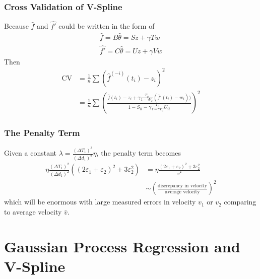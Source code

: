 \documentclass{beamer}
\begin{document}
\begin{frame}
\frametitle{Cross Validation of V-Spline}

Because $\hat{f}$ and $\hat{f'}$ could be written in the form of
\begin{align*}
\hat{f}=B\hat{\theta}=Sz+\gamma Tw\\
\hat{f'}=C\hat{\theta}=Uz+\gamma Vw
\end{align*}
Then
\begin{align*}
\mbox{CV}&=\frac{1}{n}\sum (\hat{f}^{(-i)}(t_i)-z_i)^2\\
&=\frac{1}{n}\sum \left(\frac{\hat{f}(t_i)-z_i+\gamma \frac{T_{ii}}{1-\gamma V_{ii}}(\hat{f}'(t_i)-w_i)) }{1-S_{ii}-\gamma \frac{T_{ii}}{1-\gamma V_{ii}}U_{ii}}\right)^2
\end{align*}
\end{frame}


\begin{frame}
\frametitle{The Penalty Term}
Given a constant $\lambda = \frac{\left(\Delta T_1\right)^3}{\left(\Delta d_1\right)^2}\eta$, the penalty term becomes
\begin{equation}\begin{split}
\eta \frac{\left(\Delta T_1\right)^2}{\left(\Delta d_1\right)^2} \left(\left(2\varepsilon_1+\varepsilon_2\right)^2+3\varepsilon_2^2\right)
&= \eta \frac{\left(2\varepsilon_1+\varepsilon_2\right)^2+3\varepsilon_2^2}{\bar{v}^2} \\&\sim \left(\frac{\mbox{discrepancy in velocity}}{\mbox{average velocity}}\right)^2
\end{split}
\end{equation}
which will be enormous with large measured errors in velocity $v_1$ or $v_2$ comparing to average velocity $\bar{v}$. 
\end{frame}

\section{Gaussian Process Regression and V-Spline}
\end{document}
